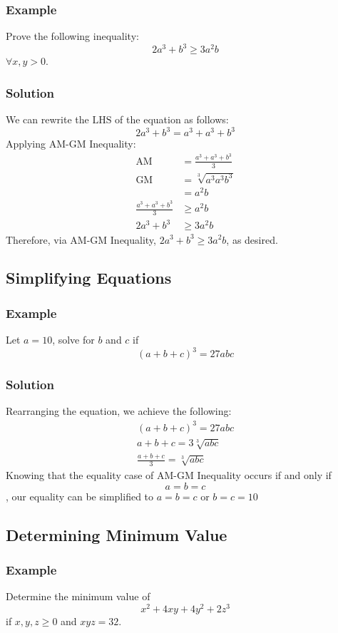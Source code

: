 \documentclass[12pt]{article}
\begin{document}
\subsubsection*{Example}
Prove the following inequality: $$2a^3 + b^3 \geq 3a^2b$$ $\forall x, y > 0$.

\subsubsection*{Solution}
We can rewrite the $\text{LHS}$ of the equation as follows: $$2a^3 + b^3 = a^3 + a^3 + b^3$$
Applying AM-GM Inequality:
\begin{align*}
    \text{AM} &= \frac{a^3 + a^3 + b^3}{3} \\
    \text{GM} &= \sqrt[3]{a^3 a^3 b^3} \\
              &= a^2 b \\
  \frac{a^3 + a^3 + b^3}{3} &\geq a^2 b \\
  2a^3 + b^3 &\geq 3a^2 b
\end{align*} 
Therefore, via AM-GM Inequality, $2a^3 + b^3 \geq 3a^2 b$, as desired.

\subsection{Simplifying Equations}
\subsubsection*{Example}
Let $a = 10$, solve for $b$ and $c$ if $$(a + b + c)^3 = 27abc$$

\subsubsection*{Solution}
Rearranging the equation, we achieve the following:
\begin{align*}
    (a + b + c)^3 = 27abc \\
    a + b + c = 3 \sqrt[3]{abc} \\
    \frac{a + b + c}{3} = \sqrt[3]{abc}
\end{align*}
Knowing that the equality case of AM-GM Inequality occurs if and only if $$a = b = c$$, our equality can be simplified to $a = b = c$ or $b = c = 10$

\subsection{Determining Minimum Value}
\subsubsection*{Example}
Determine the minimum value of $$x^2 + 4xy + 4y^2 + 2z^3$$ if $x, y, z \geq 0$ and $xyz = 32$.
\end{document}
